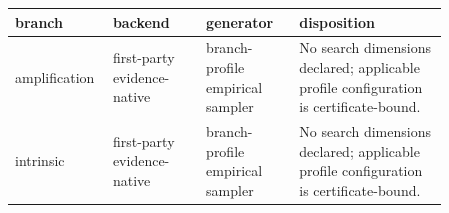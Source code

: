 \AccessibleTableHeaderRow
\begin{tabular}{@{}p{0.14\linewidth}p{0.20\linewidth}p{0.20\linewidth}p{0.32\linewidth}@{}}
\toprule
branch & backend & generator & disposition\\
\midrule
amplification & first-party evidence-native & branch-profile empirical sampler & No search dimensions declared; applicable profile configuration is certificate-bound.\\
intrinsic & first-party evidence-native & branch-profile empirical sampler & No search dimensions declared; applicable profile configuration is certificate-bound.\\
\bottomrule
\end{tabular}
